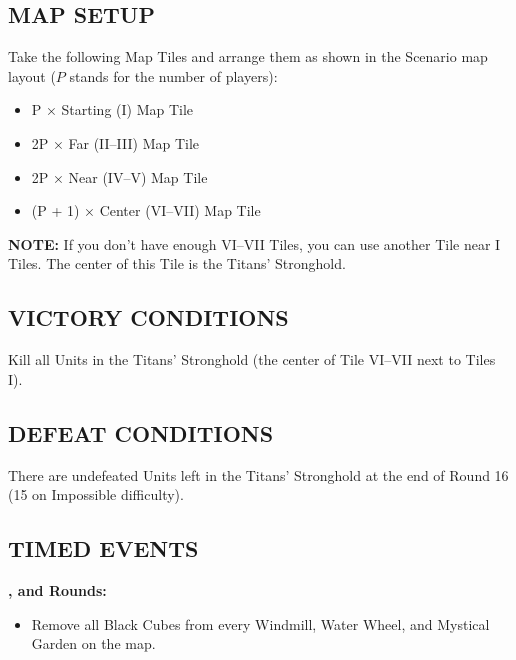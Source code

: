 \begin{multicols*}{2}
\vspace*{\fill}\columnbreak

\subsection*{\MakeUppercase{Map Setup}}

Take the following Map Tiles and arrange them as shown in the Scenario map layout ($P$ stands for the number of players):

\begin{itemize}
  \item P × Starting (I) Map Tile
  \item 2P × Far (II--III) Map Tile
  \item 2P × Near (IV--V) Map Tile
  \item (P + 1) × Center (VI--VII) Map Tile
\end{itemize}

\textbf{\MakeUppercase{Note:}} If you don’t have enough VI--VII Tiles, you can
use another Tile near I Tiles. The center of this
Tile is the Titans’ Stronghold.

\subsection*{\MakeUppercase{Victory Conditions}}

Kill all Units in the Titans' Stronghold (the center of Tile VI--VII next to Tiles I).

\subsection*{\MakeUppercase{Defeat Conditions}}

There are undefeated Units left in the Titans' Stronghold at the end of Round 16 (15 on Impossible difficulty).

\subsection*{\MakeUppercase{Timed Events}}

\textbf{,  and  Rounds:}
\begin{itemize}
  \item Remove all Black Cubes from every Windmill, Water Wheel, and Mystical Garden on the map.
\end{itemize}

\vspace*{\fill}\columnbreak


\end{multicols*}
